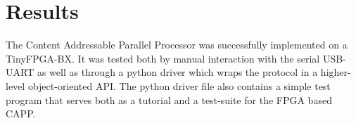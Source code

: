 \section{Results}
The Content Addressable Parallel Processor was successfully implemented on a TinyFPGA-BX. It was tested both by manual interaction with the serial USB-UART as well as through a python driver which wraps the protocol in a higher-level object-oriented API. The python driver file also contains a simple test program that serves both as a tutorial and a test-suite for the FPGA based CAPP.